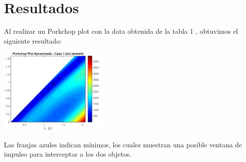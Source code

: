 \section{Resultados}

Al realizar un Porkchop plot con la data obtenida de la tabla 1
\parencite{xia2021}, obtuvimos el siguiente resultado:

\begin{center}
    \includegraphics[width=0.4\textwidth]{porkchop_emma.jpg}
\end{center}

Las franjas azules indican mínimos, los cuales muestran una posible ventana de
impulso para interceptar a los dos objetos.